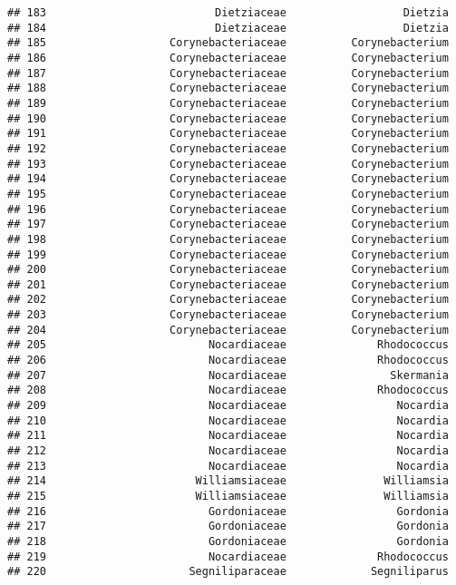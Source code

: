 \documentclass[
]{article}
\begin{document}
\begin{verbatim}
## 183                          Dietziaceae                  Dietzia
## 184                          Dietziaceae                  Dietzia
## 185                   Corynebacteriaceae          Corynebacterium
## 186                   Corynebacteriaceae          Corynebacterium
## 187                   Corynebacteriaceae          Corynebacterium
## 188                   Corynebacteriaceae          Corynebacterium
## 189                   Corynebacteriaceae          Corynebacterium
## 190                   Corynebacteriaceae          Corynebacterium
## 191                   Corynebacteriaceae          Corynebacterium
## 192                   Corynebacteriaceae          Corynebacterium
## 193                   Corynebacteriaceae          Corynebacterium
## 194                   Corynebacteriaceae          Corynebacterium
## 195                   Corynebacteriaceae          Corynebacterium
## 196                   Corynebacteriaceae          Corynebacterium
## 197                   Corynebacteriaceae          Corynebacterium
## 198                   Corynebacteriaceae          Corynebacterium
## 199                   Corynebacteriaceae          Corynebacterium
## 200                   Corynebacteriaceae          Corynebacterium
## 201                   Corynebacteriaceae          Corynebacterium
## 202                   Corynebacteriaceae          Corynebacterium
## 203                   Corynebacteriaceae          Corynebacterium
## 204                   Corynebacteriaceae          Corynebacterium
## 205                         Nocardiaceae              Rhodococcus
## 206                         Nocardiaceae              Rhodococcus
## 207                         Nocardiaceae                Skermania
## 208                         Nocardiaceae              Rhodococcus
## 209                         Nocardiaceae                 Nocardia
## 210                         Nocardiaceae                 Nocardia
## 211                         Nocardiaceae                 Nocardia
## 212                         Nocardiaceae                 Nocardia
## 213                         Nocardiaceae                 Nocardia
## 214                       Williamsiaceae               Williamsia
## 215                       Williamsiaceae               Williamsia
## 216                         Gordoniaceae                 Gordonia
## 217                         Gordoniaceae                 Gordonia
## 218                         Gordoniaceae                 Gordonia
## 219                         Nocardiaceae              Rhodococcus
## 220                      Segniliparaceae             Segniliparus

\end{verbatim}
\end{document}
